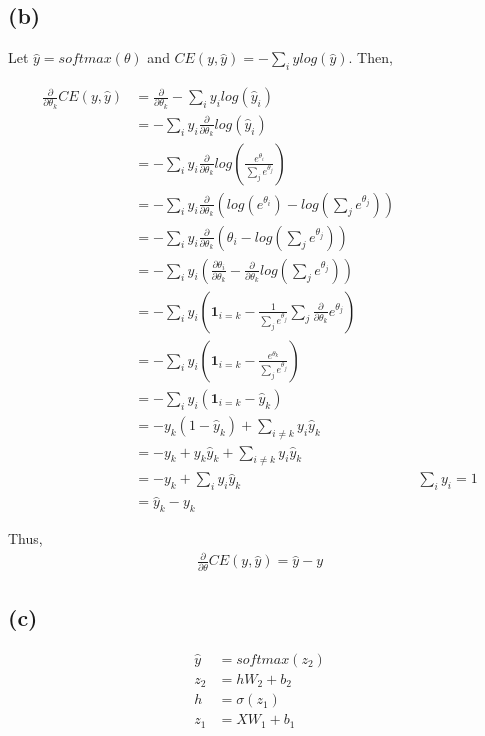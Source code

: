 \documentclass{article}
\begin{document}
\subsection*{(b)}
Let $\hat{y} = softmax(\theta)$ and $CE(y, \hat{y}) = -\sum_{i}{y log(\hat{y})}$. Then,

\begin{align*}
    \frac{ \partial }{ \partial \theta_{k} } CE(y, \hat{y})
      &= \frac{ \partial }{ \partial \theta_{k} } -\sum_{i}{y_i log(\hat{y}_i)} \\
      &= -\sum_{i}{y_i \frac{ \partial }{ \partial \theta_{k} } log(\hat{y}_i)} \\
      &= -\sum_{i}{y_i \frac{ \partial }{ \partial \theta_{k} } log(\frac{e^{\theta_i}}{\sum_{j}{e^{\theta_j}}})} \\
      &= -\sum_{i}{y_i \frac{ \partial }{ \partial \theta_{k} } (log(e^{\theta_i}) - log(\sum_{j}{e^{\theta_j}}))} \\
      &= -\sum_{i}{y_i \frac{ \partial }{ \partial \theta_{k} } (\theta_i - log(\sum_{j}{e^{\theta_j}}))} \\
      &= -\sum_{i}{y_i (\frac{ \partial \theta_{i} }{ \partial \theta_{k} } - \frac{ \partial }{ \partial \theta_{k} }log(\sum_{j}{e^{\theta_j}}) )} \\
      &= -\sum_{i}{y_i (\mathbf{1}_{i=k} - \frac{1}{\sum_{j}{e^{\theta_j}}} \sum_{j}{\frac{ \partial }{ \partial \theta_{k} } e^{\theta_j}} )} \\
      &= -\sum_{i}{y_i (\mathbf{1}_{i=k} - \frac{ e^{\theta_k} }{\sum_{j}{e^{\theta_j}}} )} \\
      &= -\sum_{i}{y_i (\mathbf{1}_{i=k} - \hat{y}_k )} \\
      &= -y_k(1 - \hat{y}_k) + \sum_{i \neq k}{y_{i}\hat{y}_{k}} \\
      &= -y_k + y_k\hat{y}_k + \sum_{i \neq k}{y_{i}\hat{y}_{k}} \\
      &= -y_k + \sum_{i}{y_{i}\hat{y}_{k}} && \sum_{i}y_{i} = 1\\
      &= \hat{y}_{k} - y_k
\end{align*}

Thus,
\begin{align*}
      \frac{ \partial }{ \partial \theta } CE(y, \hat{y}) = \hat{y} - y
\end{align*}

\subsection*{(c)}
\begin{equation*}
  \label{eq:forward-pass}
  \begin{split}
    \hat{y} &= softmax(z_{2}) \\
    z_{2} &= hW_{2} + b_{2} \\
    h &= \sigma(z_{1}) \\
    z_{1} &= XW_{1} + b_{1}
  \end{split}
\end{equation*}
\end{document}

